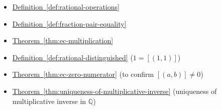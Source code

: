 \begin{dependencies}
\begin{itemize}
  \item \hyperref[def:rational-operations]{Definition~\ref*{def:rational-operations}}
  \item \hyperref[def:fraction-pair-equality]{Definition~\ref*{def:fraction-pair-equality}}
  \item \hyperref[thm:ec-multiplication]{Theorem~\ref*{thm:ec-multiplication}}
  \item \hyperref[def:rational-distinguished]{Definition~\ref*{def:rational-distinguished}}
        \textnormal{($1 = [(1,1)]$)}
  \item \hyperref[thm:ec-zero-numerator]{Theorem~\ref*{thm:ec-zero-numerator}}
        \textnormal{(to confirm $[(a,b)]\neq 0$)}
  \item \hyperref[thm:uniqueness-of-multiplicative-inverse]{Theorem~\ref*{thm:uniqueness-of-multiplicative-inverse}}
        \textnormal{(uniqueness of multiplicative inverse in $\mathbb{Q}$)}
\end{itemize}
\end{dependencies}

\clearpage
